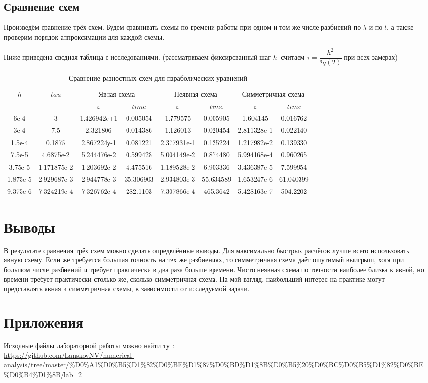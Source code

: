 \documentclass[12pt]{article}
\begin{document}
\subsection{Сравнение схем}
Произведём сравнение трёх схем. Будем сравнивать схемы по времени работы при одном и том же числе разбиений по $h$ и по $t$, а также проверим порядок аппроксимации для каждой схемы.

Ниже приведена сводная таблица с исследованиями. (рассматриваем фиксированный шаг $h$, считаем $\tau = \dfrac{h^2}{2q(2)}$ при всех замерах)

\begin{table}[H]
\caption{Сравнение разностных схем для параболических уравнений }
\begin{center}
\begin{tabular}{|c|c|c|c|c|c|c|c|}
\hline
\multirow{2}{*}{$h$} & \multirow{2}{*}{$tau$} & \multicolumn{2}{|c|}{Явная схема} & \multicolumn{2}{|c|}{Неявная схема} &\multicolumn{2}{|c|}{Симметричная схема}  \\
\cline{3-8}
& & $\varepsilon$ & $time$ & $\varepsilon$ & $time$ & $\varepsilon$ & $time$ \\
\hline
6e-4 & 3 & 1.426942e+1 & 0.005054 & 1.779575 & 0.005905 & 1.604145 & 0.016762 \\
\hline
3e-4 & 7.5 & 2.321806 & 0.014386 & 1.126013 & 0.020454 & 2.811328e-1 & 0.022140 \\
\hline
1.5e-4 & 0.1875 & 2.867224у-1 & 0.081221 & 2.377931e-1 & 0.125224 & 1.217982e-2 & 0.139330 \\
\hline
7.5e-5 & 4.6875e-2 & 5.244476e-2 & 0.599428 & 5.004149e-2 & 0.874480 & 5.994168e-4 & 0.960265 \\ 
\hline
3.75e-5 & 1.171875e-2 & 1.203692e-2 & 4.475516 & 1.189528e-2 & 6.903336 & 3.436387e-5 & 7.599954 \\
\hline
1.875e-5 & 2.929687e-3 & 2.944778e-3 & 35.306903 & 2.934803e-3 & 55.634589 & 1.653247e-6 & 61.040399 \\
\hline
9.375e-6 & 7.324219e-4 & 7.326762e-4 & 282.1103 & 7.307866e-4 & 465.3642 & 5.428163e-7 & 504.2202 \\
\hline

\end{tabular}
\end{center}
\end{table}

\section{Выводы}
В результате сравнения трёх схем можно сделать определённые выводы. Для максимально быстрых расчётов лучше всего использовать явную схему. Если же требуется большая точность на тех же разбиениях, то симметричная схема даёт ощутимый выигрыш, хотя при большом числе разбиений и требует практически в два раза больше времени. Чисто неявная схема по точности наиболее близка к явной, но времени требует практически столько же, сколько симметричная схема. На мой взгляд, наибольший интерес на практике могут представлять явная и симметричная схемы, в зависимости от исследуемой задачи.

\section{Приложения}
Исходные файлы лабораторной работы можно найти тут: \\
\url{https://github.com/LanskovNV/numerical-analysis/tree/master/%D0%A1%D0%B5%D1%82%D0%BE%D1%87%D0%BD%D1%8B%D0%B5%20%D0%BC%D0%B5%D1%82%D0%BE%D0%B4%D1%8B/lab_2}
\end{document}
